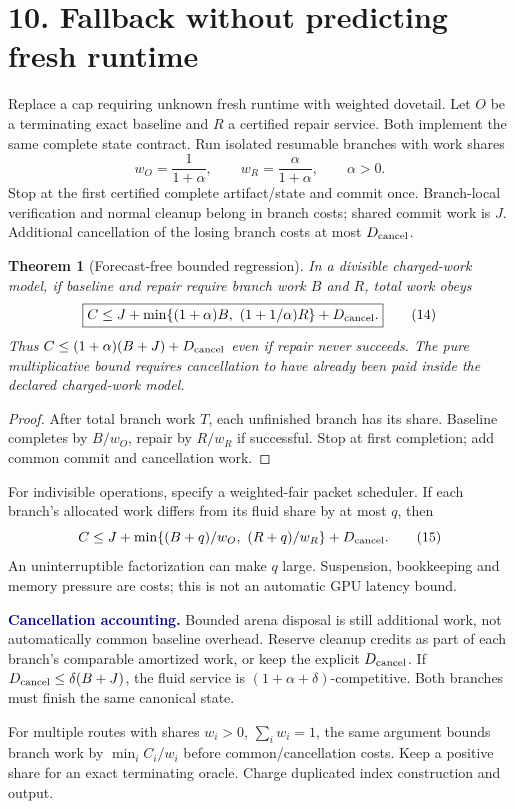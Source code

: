 \documentclass[11pt]{article}
\newtheorem{theorem}{Theorem}\newtheorem{lemma}{Lemma}\newtheorem{corollary}{Corollary}
\newcommand{\note}[1]{\textcolor{navy}{\textbf{#1}}}
\begin{document}
\newpage
\section*{10. Fallback without predicting fresh runtime}
Replace a cap requiring unknown fresh runtime with weighted dovetail. Let $O$ be a terminating exact baseline and $R$ a certified repair service. Both implement the same complete state contract. Run isolated resumable branches with work shares
\[
 w_O=\frac1{1+\alpha},\qquad w_R=\frac\alpha{1+\alpha},\qquad\alpha>0.
\]
Stop at the first certified complete artifact/state and commit once. Branch-local verification and normal cleanup belong in branch costs; shared commit work is $J$. Additional cancellation of the losing branch costs at most $D_{\rm cancel}$.

\begin{theorem}[Forecast-free bounded regression]
In a divisible charged-work model, if baseline and repair require branch work $B$ and $R$, total work obeys
\[
 \boxed{C\leq J+\min\{(1+\alpha)B,\ (1+1/\alpha)R\}+D_{\rm cancel}.} \tag{14}
\]
Thus $C\leq(1+\alpha)(B+J)+D_{\rm cancel}$ even if repair never succeeds. The pure multiplicative bound requires cancellation to have already been paid inside the declared charged-work model.
\end{theorem}
\begin{proof}
After total branch work $T$, each unfinished branch has its share. Baseline completes by $B/w_O$, repair by $R/w_R$ if successful. Stop at first completion; add common commit and cancellation work.
\end{proof}

For indivisible operations, specify a weighted-fair packet scheduler. If each branch's allocated work differs from its fluid share by at most $q$, then
\[
 C\leq J+\min\{(B+q)/w_O,\ (R+q)/w_R\}+D_{\rm cancel}. \tag{15}
\]
An uninterruptible factorization can make $q$ large. Suspension, bookkeeping and memory pressure are costs; this is not an automatic GPU latency bound.

\note{Cancellation accounting.} Bounded arena disposal is still additional work, not automatically common baseline overhead. Reserve cleanup credits as part of each branch's comparable amortized work, or keep the explicit $D_{\rm cancel}$. If $D_{\rm cancel}\leq\delta(B+J)$, the fluid service is $(1+\alpha+\delta)$-competitive. Both branches must finish the same canonical state.

For multiple routes with shares $w_i>0$, $\sum_iw_i=1$, the same argument bounds branch work by $\min_i C_i/w_i$ before common/cancellation costs. Keep a positive share for an exact terminating oracle. Charge duplicated index construction and output.
\end{document}
